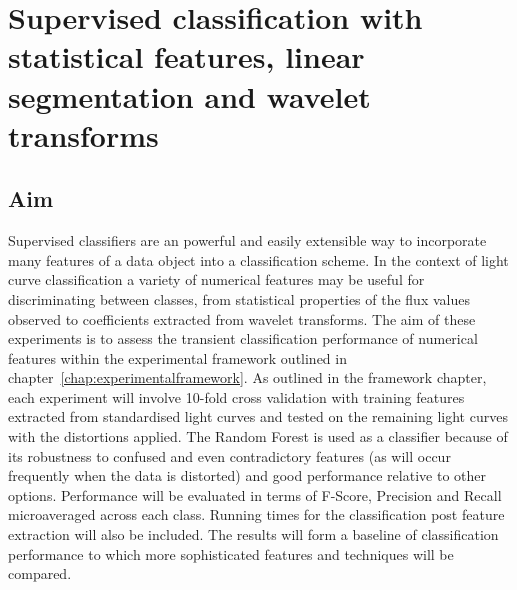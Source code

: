 
%
%
%
%
	
	\chapter{Supervised classification with statistical features, linear segmentation and wavelet transforms} %
	\section{Aim}
		Supervised classifiers are an powerful and easily extensible way to incorporate many features of a data object into a classification scheme. In the context of light curve classification a variety of numerical features may be useful for discriminating between classes, from statistical properties of the flux values observed to coefficients extracted from wavelet transforms. The aim of these experiments is to assess the transient classification performance of numerical features within the experimental framework outlined in chapter~\ref{chap:experimentalframework}. As outlined in the framework chapter, each experiment will involve 10-fold cross validation with training features extracted from standardised light curves and tested on the remaining light curves with the distortions applied. The Random Forest is used as a classifier because of its robustness to confused and even contradictory features (as will occur frequently when the data is distorted) and good performance relative to other options. Performance will be evaluated in terms of F-Score, Precision and Recall microaveraged across each class. Running times for the classification post feature extraction will also be included. The results will form a baseline of classification performance to which more sophisticated features and techniques will be compared. %

